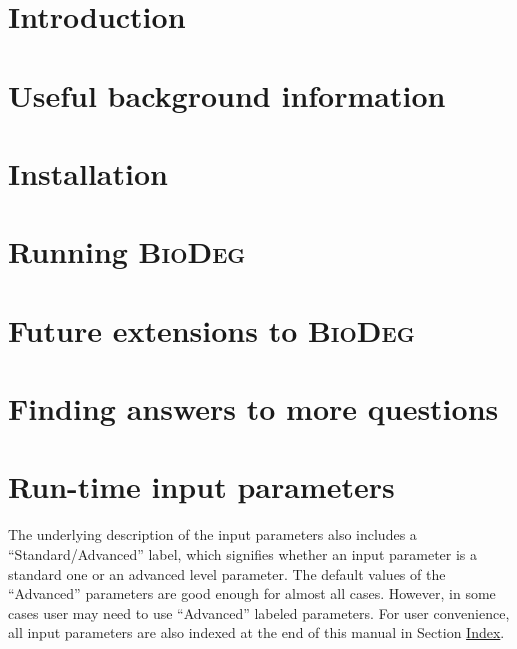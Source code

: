 \documentclass{article}
\newcommand{\biodeg}{\textsc{BioDeg}}
\begin{document}
\pagebreak

\onehalfspacing

\tableofcontents

\pagebreak

\section{Introduction}
\label{sec:intro}


\section{Useful background information}
\label{sec:background}


\section{Installation}
\label{sec:installation}


\section{Running \biodeg}
\label{sec:run}


\section{Future extensions to \biodeg}
\label{sec:future}


\section{Finding answers to more questions}
\label{sec:questions-and-answers}


\appendix

\section{Run-time input parameters}
\label{sec:parameters}
The underlying description of the input parameters also includes a ``Standard/Advanced'' label, which signifies whether an input parameter is a standard one or an advanced level parameter. The default values of the ``Advanced'' parameters are good enough for almost all cases. However, in some cases user may need to use ``Advanced'' labeled parameters. For user convenience, all input parameters are also indexed at the end of this manual in Section \hyperref[sec:index]{Index}.



\pagebreak


\printindex[prmindexfull]
\end{document}
